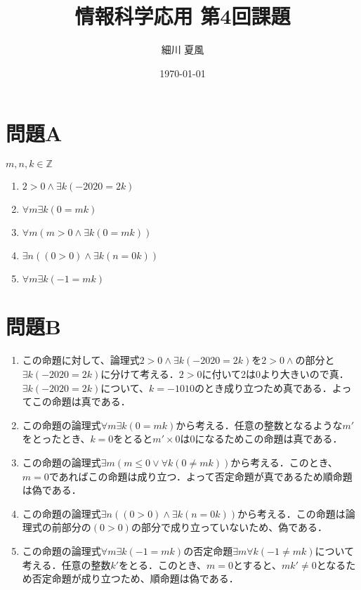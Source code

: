 \documentclass[dvipdfmx]{jlreq}
\title{情報科学応用 第4回課題}
\author{細川 夏風}
\date{\today}
\begin{document}
	\maketitle

	\section{問題A}
		$m, n, k \in \mathbb{Z}$	
		\begin{enumerate}[(1)]
			\item $2 > 0 \land \exists k(-2020 = 2k)$
			\item $\forall m \exists k(0 = mk)$
			\item $\forall m (m > 0 \land \exists k(0 = mk))$
			\item $\exists n ((0 > 0) \land \exists k(n = 0k))$
			\item $\forall m \exists k(-1 = mk)$
		\end{enumerate}

	\section{問題B}
		\begin{enumerate}[(1)]
			\item この命題に対して、論理式$2 > 0 \land \exists k(-2020 = 2k)$を$2 > 0 \land$の部分と$\exists k(-2020 = 2k)$に分けて考える．$2 > 0$に付いて2は0より大きいので真．$\exists k(-2020 = 2k)$について、$k = -1010$のとき成り立つため真である．よってこの命題は真である．
			\item この命題の論理式$\forall m \exists k(0 = mk)$から考える．任意の整数となるような$m'$をとったとき、$k = 0$をとると$m' \times 0$は$0$になるためこの命題は真である．
			\item この命題の論理式$\exists m(m \leq 0 \lor \forall k(0 \neq mk))$から考える．このとき、$m = 0$であればこの命題は成り立つ．よって否定命題が真であるため順命題は偽である．
			\item この命題の論理式$\exists n ((0 > 0) \land \exists k(n = 0k))$から考える．この命題は論理式の前部分の$(0 > 0)$の部分で成り立っていないため、偽である．
			\item この命題の論理式$\forall m \exists k(-1 = mk)$の否定命題$\exists m \forall k (-1 \neq mk)$について考える．任意の整数$k'$をとる．このとき、$m = 0$とすると、$mk' \neq 0$となるため否定命題が成り立つため、順命題は偽である．
		\end{enumerate}
\end{document}

